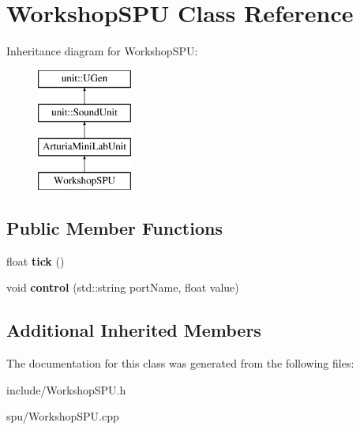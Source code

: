 \hypertarget{classWorkshopSPU}{}\section{Workshop\+S\+PU Class Reference}
\label{classWorkshopSPU}
Inheritance diagram for Workshop\+S\+PU\+:\begin{figure}[H]
\begin{center}
\leavevmode
\includegraphics[height=4.000000cm]{classWorkshopSPU}
\end{center}
\end{figure}
\subsection*{Public Member Functions}
\begin{DoxyCompactItemize}
\item 
float {\bfseries tick} ()\hypertarget{classWorkshopSPU_a8721f1f7429f4b7f3ced46fc781674b7}{}\label{classWorkshopSPU_a8721f1f7429f4b7f3ced46fc781674b7}

\item 
void {\bfseries control} (std\+::string port\+Name, float value)\hypertarget{classWorkshopSPU_a72adc07c2054fd0cdfe623da30bb23ba}{}\label{classWorkshopSPU_a72adc07c2054fd0cdfe623da30bb23ba}

\end{DoxyCompactItemize}
\subsection*{Additional Inherited Members}


The documentation for this class was generated from the following files\+:\begin{DoxyCompactItemize}
\item 
include/Workshop\+S\+P\+U.\+h\item 
spu/Workshop\+S\+P\+U.\+cpp\end{DoxyCompactItemize}
